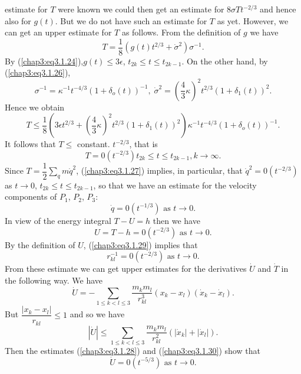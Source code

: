 estimate for $T$ were known we could then get an estimate for $8
\sigma T t^{-2/3}$ and hence also for $g(t)$. But we do not have such
an estimate for $T$ as yet. However, we can get an upper estimate for
$T$ as follows. From the definition of $g$ we have
$$
T = \frac{1}{8}(g(t) t^{2/3} + \dot{\sigma}^2) \sigma^{-1}. 
$$
By (\ref{chap3:eq3.1.24}),\pageoriginale $g(t) \leq 3 \epsilon$,
$t_{2k} \leq t \leq 
t_{2k-1}$. On the other hand, by (\ref{chap3:eq3.1.26}), 
$$
\sigma^{-1} =\kappa^{-1} t^{-4/3} (1+ \delta_o (t))^{-1}, \;
\dot{\sigma}^2= (\frac{4}{3}\kappa)^2 t^{2/3} (1+ \delta_1 (t))^2. 
$$
Hence we obtain
$$
T \leq \frac{1}{8} (3 \epsilon t^{2/3} + (\frac{4}{3} \kappa)^2
t^{2/3} (1+ \delta_1 (t))^2) \kappa^{-1} t^{-4/3} (1+ \delta_o
(t))^{-1}. 
$$
It follows that $T \leq $ constant. $t^{-2/3}$, that is 
\begin{equation*}
T = 0 (t^{-2/3}) t_{2k} \leq t \leq t_{2k-1}, k \to
\infty. \tag{3.1.27}\label{chap3:eq3.1.27} 
\end{equation*}
Since $T = \dfrac{1}{2} \sum\limits_q m \dot{q}^2$,
(\ref{chap3:eq3.1.27}) implies, 
in particular, that $\dot{q}^2 = 0 (t^{-2/3})$ as $t\to 0$, $t_{2k }
\leq t \leq t_{2k-1}$, so that we have an estimate for the velocity
components of $P_1$, $P_2$, $P_3$:
\begin{equation*}
\dot{q} = 0 (t^{-1/3}) \text{ as } t \to
0. \tag{3.1.28}\label{chap3:eq3.1.28} 
\end{equation*}
In view of the energy integral $T - U =h$ then we have
\begin{equation*}
U  = T - h =0 (t^{-2/3}) \text{ as } t \to
0. \tag{3.1.29}\label{chap3:eq3.1.29} 
\end{equation*}
By the definition of $U$, (\ref{chap3:eq3.1.29}) implies that
\begin{equation*}
r^{-1}_{kl} = 0 (t^{-2/3}) \text{ as } t \to
0. \tag{3.1.30}\label{chap3:eq3.1.30} 
\end{equation*}
From these estimate we can get upper estimates for the derivatives
$\dot{U}$ and $\dot{T}$  in the following way. We have
$$
\dot{U} = - \sum\limits_{1 \leq k < l \leq 3} \frac{m_k m_l}{r^3_{kl}}
(x_k - x_l) (\dot{x}_k - \dot{x}_l).
$$\pageoriginale
But $\dfrac{|x_k - x_l|}{r_{kl}} \leq 1$ and so we have
$$
|\dot{U}| \leq \sum\limits_{1 \leq k < l \leq 3}
\frac{m_km_l}{r^2_{kl}} (|\dot{x}_k| + |\dot{x}_l|).
$$
Then the estimates (\ref{chap3:eq3.1.28}) and (\ref{chap3:eq3.1.30})
show that 
\begin{equation*}
\dot{U} = 0 (t^{-5/3}) \text{ as } t \to
0. \tag{3.1.31}\label{chap3:eq3.1.31} 
\end{equation*}
